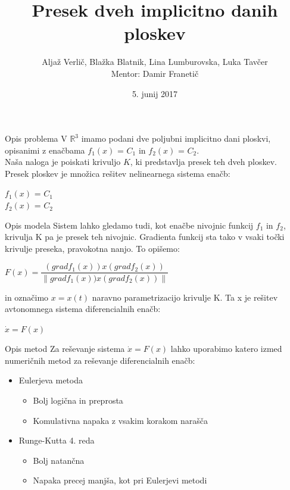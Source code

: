 \documentclass{beamer}
\title{Presek dveh implicitno danih ploskev}
\author[Avtorji]{Aljaž Verlič, Blažka Blatnik, Lina Lumburovska, Luka Tavčer\\
Mentor: Damir Franetič}
\date{5. junij 2017}
\begin{document}
\begin{frame}
  \titlepage
\end{frame}

\begin{frame}{Opis problema}
   V $\mathbb{R}^3$ imamo podani dve poljubni implicitno dani ploskvi, opisanimi z enačbama $f_{1}(x)$ = $C_{1}$ in $f_{2}(x)$ = $C_{2}$.\\
   Naša naloga je poiskati krivuljo $K$, ki predstavlja presek teh dveh ploskev.\\
   \vspace{5mm}
   Presek ploskev je množica rešitev nelinearnega sistema enačb:
   \begin{center}
		$f_{1}(x)$ = $C_{1}$\\$f_{2}(x)$ = $C_{2}$
	\end{center}
\end{frame}

\begin{frame}{Opis modela}
  Sistem lahko gledamo tudi, kot enačbe nivojnic funkcij  $f_{1}$ in $f_{2}$, krivulja K pa je presek teh nivojnic. Gradienta funkcij sta tako v vsaki točki krivulje preseka, pravokotna nanjo. To opišemo:
    \begin{center}
        	$F(x) = \dfrac{(grad f_{1}(x))x (grad f_{2}(x))}{\|grad f_{1}(x))x (grad f_{2}(x))\|}$
    \end{center}
   in označimo $x = x(t)$ naravno parametrizacijo krivulje K. Ta x je rešitev avtonomnega sistema diferencialnih enačb:
   \begin{center}
		$\dot{x} = F(x)$
	\end{center}
\end{frame}

\begin{frame}{Opis metod}
 Za reševanje sistema $\dot{x} = F(x)$ lahko uporabimo katero izmed numeričnih metod za reševanje diferencialnih enačb:
 \begin{itemize}
    \item Eulerjeva metoda
    \begin{itemize}
        \item Bolj logična in preprosta
        \item Komulativna napaka z vsakim korakom narašča
    \end{itemize}
    \item Runge-Kutta 4. reda
    \begin{itemize}
        \item Bolj natančna
        \item Napaka precej manjša, kot pri Eulerjevi metodi
    \end{itemize}
 \end{itemize}
\end{frame}
\end{document}

